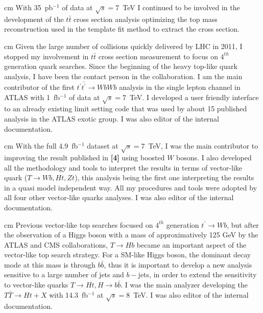 \documentclass[12pt]{article}
\begin{document}
 cm
\noindent {\bf \color{red} [3]} With 35~pb$^{-1}$ of data at $\sqrt{s}=7$~TeV I continued to be involved in the development of the $t\bar{t}$ cross section analysis optimizing the top mass reconstruction used in the template fit method to extract the cross section.

 cm
\noindent {\bf \color{red} [4]} Given the large number of collisions quickly delivered by LHC in 2011, I stopped my involvement in $t\bar{t}$ cross section measurement to focus on $4^{th}$ generation quark searches. Since the beginning of the heavy top-like quark analysis, I have been the contact person in the collaboration. I am the main contributor of the first $t^{\prime}\bar{t^{\prime}} \rightarrow WbWb$ analysis in the single lepton channel in ATLAS with 1~fb$^{-1}$ of data at $\sqrt{s}=7$~TeV. I developed a user friendly interface to an already existing limit setting code that was used by about 15 published analysis in the ATLAS exotic group. I was also editor of the internal documentation.

 cm
\noindent {\bf \color{red} [5]} With the full 4.9~fb$^{-1}$ dataset at $\sqrt{s}=7$~TeV, I was the main contributor to improving the result published in {\bf \color{red} [4]} using boosted $W$ bosons. I also developed all the methodology and tools to interpret the results in terms of vector-like quark ($T \rightarrow Wb,Ht, Zt$), this analysis being the first one interpreting the results in a quasi model independent way. All my procedures and tools were adopted by all four other vector-like quarks analyses. I was also editor of the internal documentation.

 cm
\noindent {\bf \color{red} [6]} Previous vector-like top searches focused on $4^{th}$ generation $t^{\prime} \rightarrow Wb$, but after the observation of a Higgs boson with a mass of approximatively 125 GeV by the ATLAS and CMS collaborations, $T \rightarrow Hb$ became an important aspect of the vector-like top search strategy. For a SM-like Higgs boson, the dominant decay mode at this mass is through $b\bar{b}$, thus it is important to develop a new analysis sensitive to a large number of jets and $b-$jets, in order to extend the sensitivity to vector-like quarks $T \rightarrow Ht, H \rightarrow b\bar{b}$. I was the main analyzer developing the $T\bar{T} \rightarrow Ht+X$ with 14.3~fb$^{-1}$ at $\sqrt{s}=8$~TeV. I was also editor of the internal documentation.
\end{document}
